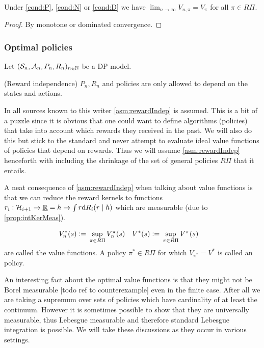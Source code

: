\documentclass{article}
\begin{document}
\begin{prop}
  Under \cref{cond:P}, \cref{cond:N} or \cref{cond:D} we have
  $\lim_{n\to\infty} V_{n, \pi} = V_\pi $
  for all $\pi \in R\Pi$.
\end{prop}
\begin{proof}
  By monotone or dominated convergence.
\end{proof}

\subsubsection{Optimal policies}

Let $(\mathcal{S}_n, \mathcal{A}_n, P_n, R_n)_{n \in \mathbb{N}}$ be a DP model.

\begin{asm}(Reward independence)
  $P_n, R_n$ and policies are only allowed to depend on the
  states and actions.
  \label{asm:rewardIndep}
\end{asm}

In all sources known to this writer \cref{asm:rewardIndep} is assumed.
This is a bit of a puzzle since it is obvious that one could
want to define algorithms (policies) that take into account which rewards
they received in the past.
We will also do this but stick to the standard and 
never attempt to evaluate ideal value functions of
policies that depend on rewards.
Thus we will assume \cref{asm:rewardIndep} henceforth with including the
shrinkage of the set of general policies $R\Pi$ that it entails.

A neat consequence of \cref{asm:rewardIndep} when talking about
value functions is that we can reduce the reward kernels to functions
$r_i : \mathcal{H}_{i+1} \to \underline{\mathbb{R}} = h \to \int r \mathrm{d} R_i(r \mid h)$
which are measurable (due to \cref{prop:intKerMeas}).

\begin{defn} 
  \begin{align*}
    V_n^*(s) \vcentcolon= & \; \sup_{\pi \in R\Pi} V_n^\pi(s) &
    V^*(s) \vcentcolon= & \; \sup_{\pi \in R\Pi} V^\pi(s)
  \end{align*}
  are called the  value functions.
  A policy $\pi^* \in R\Pi$ for which $V_{\pi^*} = V^*$ is called an
   policy.
\end{defn}

An interesting fact about the optimal value functions is that they
might not be Borel measurable [todo ref to counterexample]
even in the finite case.
After all we are taking a supremum over
sets of policies which have cardinality of at least the continuum.
However it is sometimes possible to show that they are
universally measurable, thus Lebesgue measurable and therefore
standard Lebesgue integration is possible.
We will take these discussions as they occur in various settings.
\end{document}
